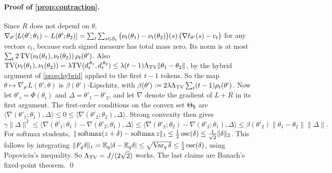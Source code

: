 \paragraph{Proof of \cref{prop:contraction}.}
Since $R$ does not depend on $\theta$, $\nabla_{\theta'}[L(\theta';\theta_1)-L(\theta';\theta_2)]=\sum_t\sum_{s\in\mathcal{S}_t}\big(\nu_t(\theta_1)-\nu_t(\theta_2)\big)(s)\,\big(\nabla\ell_{\theta'}(s)-c_t\big)$ for any
vectors $c_t$, because each signed measure has total mass zero. Its norm is at most
$\sum_t2\,\mathrm{TV}(\nu_t(\theta_1),\nu_t(\theta_2))\,\rho_t(\theta')$. Also $\mathrm{TV}(\nu_t(\theta_1),\nu_t(\theta_2))=\lambda\mathrm{TV}(d^{\,\theta_1}_t,d^{\,\theta_2}_t)\le\lambda(t-1)\Lambda_{\mathrm{TV}}\|\theta_1-\theta_2\|$, by the
hybrid argument of \cref{prop:hybrid} applied to the first $t-1$ tokens. So the map $\theta\mapsto\nabla_{\theta'}L(\theta';\theta)$ is $\beta(\theta')$-Lipschitz, with
$\beta(\theta'):=2\lambda\Lambda_{\mathrm{TV}}\sum_t(t-1)\rho_t(\theta')$. Now let $\theta'_i=\Phi(\theta_i)$ and $\Delta=\theta'_1-\theta'_2$, and let $\nabla$ denote the gradient of $L+R$ in its
first argument. The first-order conditions on the convex set $\Theta_{\mathsf{S}}$ are $\langle\nabla(\theta'_1;\theta_1),\Delta\rangle\le0\le\langle\nabla(\theta'_2;\theta_2),\Delta\rangle$. Strong
convexity then gives
\[
\gamma\|\Delta\|^2\le\langle\nabla(\theta'_1;\theta_1)-\nabla(\theta'_2;\theta_1),\Delta\rangle\le\langle\nabla(\theta'_2;\theta_2)-\nabla(\theta'_2;\theta_1),\Delta\rangle\le\beta(\theta'_2)\|\theta_1-\theta_2\|\|\Delta\| .
\]
For softmax students, $\|\operatorname{softmax}(z+\delta)-\operatorname{softmax} z\|_1\le\frac12\operatorname{osc}(\delta)\le\frac1{\sqrt2}\|\delta\|_2$. This follows by integrating
$\|F_q\delta\|_1=\mathbb{E}_q|\delta-\mathbb{E}_q\delta|\le\sqrt{\operatorname{Var}_q\delta}\le\frac12\operatorname{osc}(\delta)$, using Popoviciu's inequality. So $\Lambda_{\mathrm{TV}}=J/(2\sqrt2)$ works. The last claims are
Banach's fixed-point theorem. \qed

